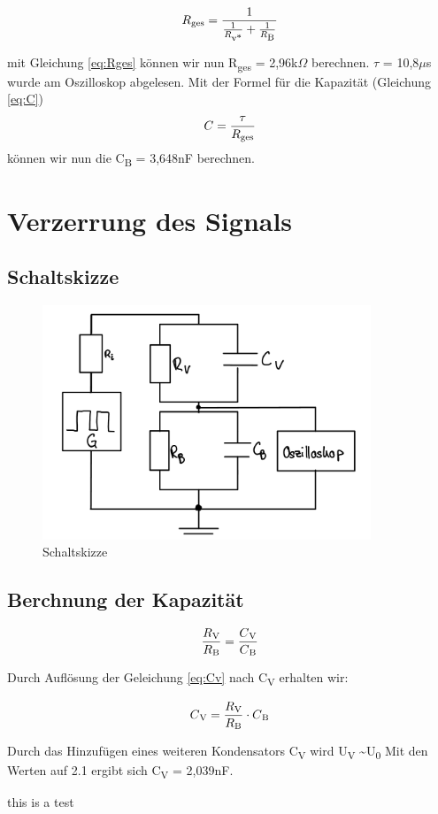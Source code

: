 \begin{equation}
	R\textsubscript{ges} = \frac{1}{\frac{1}{R\textsubscript{v*}} + 
	\frac{1}{R\textsubscript{B}}}
	\label{eq:Rges}
\end{equation}

mit Gleichung \ref*{eq:Rges} können wir nun R\textsubscript{ges} = 2,96k$\Omega$
berechnen.
$\tau$ = 10,8$\mu$s wurde am Oszilloskop abgelesen. Mit der Formel für die Kapazität
(Gleichung \ref*{eq:C})
\begin{equation}
	C = \frac{\tau}{R\textsubscript{ges}}
	\label{eq:C}
\end{equation}
können wir nun die C\textsubscript{B} = 3,648nF berechnen.


\section{Verzerrung des Signals}
\subsection{Schaltskizze}

\begin{figure}[H]
	\centering
	\includegraphics[height=7cm]{images/Versuch2/2_Schaltungsskizze.jpeg} 
	\caption{Schaltskizze}
	\label{fig: Schaltungsskizze}
\end{figure}

\subsection{Berchnung der Kapazität}

\begin{equation}
	\frac{R\textsubscript{V}}{R\textsubscript{B}} = \frac{C\textsubscript{V}}{C\textsubscript{B}}
	\label{eq:Cv}
\end{equation}

Durch Auflösung der Geleichung \ref*{eq:Cv} nach C\textsubscript{V}
erhalten wir: 

\begin{equation}
	C\textsubscript{V} = \frac{R\textsubscript{V}}{R\textsubscript{B}} \cdot C\textsubscript{B}
	\label{eq:Cv2}
\end{equation}

Durch das Hinzufügen eines weiteren Kondensators C\textsubscript{V} 
wird U\textsubscript{V} \textasciitilde U\textsubscript{0}
Mit den Werten auf 2.1 ergibt sich C\textsubscript{V} = 2,039nF.



this is a test
